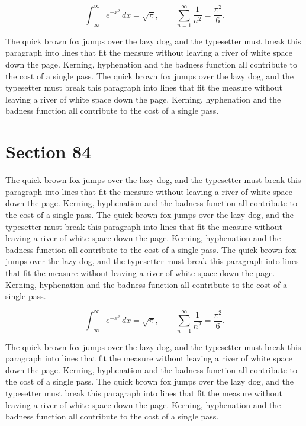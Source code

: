\documentclass{article}
\begin{document}
\begin{equation}
\int_{-\infty}^{\infty} e^{-x^{2}}\,dx = \sqrt{\pi}, \qquad
\sum_{n=1}^{\infty} \frac{1}{n^{2}} = \frac{\pi^{2}}{6}.
\end{equation}

The quick brown fox jumps over the lazy dog, and the typesetter must break this paragraph into lines that fit the measure without leaving a river of white space down the page. Kerning, hyphenation and the badness function all contribute to the cost of a single pass. The quick brown fox jumps over the lazy dog, and the typesetter must break this paragraph into lines that fit the measure without leaving a river of white space down the page. Kerning, hyphenation and the badness function all contribute to the cost of a single pass. 
\section{Section 84}
The quick brown fox jumps over the lazy dog, and the typesetter must break this paragraph into lines that fit the measure without leaving a river of white space down the page. Kerning, hyphenation and the badness function all contribute to the cost of a single pass. The quick brown fox jumps over the lazy dog, and the typesetter must break this paragraph into lines that fit the measure without leaving a river of white space down the page. Kerning, hyphenation and the badness function all contribute to the cost of a single pass. The quick brown fox jumps over the lazy dog, and the typesetter must break this paragraph into lines that fit the measure without leaving a river of white space down the page. Kerning, hyphenation and the badness function all contribute to the cost of a single pass. 

\begin{equation}
\int_{-\infty}^{\infty} e^{-x^{2}}\,dx = \sqrt{\pi}, \qquad
\sum_{n=1}^{\infty} \frac{1}{n^{2}} = \frac{\pi^{2}}{6}.
\end{equation}

The quick brown fox jumps over the lazy dog, and the typesetter must break this paragraph into lines that fit the measure without leaving a river of white space down the page. Kerning, hyphenation and the badness function all contribute to the cost of a single pass. The quick brown fox jumps over the lazy dog, and the typesetter must break this paragraph into lines that fit the measure without leaving a river of white space down the page. Kerning, hyphenation and the badness function all contribute to the cost of a single pass. 
\end{document}
